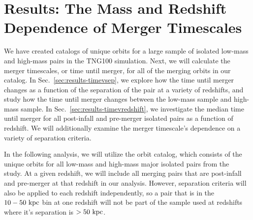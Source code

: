 \documentclass[twocolumn,linenumbers]{aastex631}
\begin{document}

\section{Results: The Mass and Redshift Dependence of Merger Timescales}
We have created catalogs of unique orbits for a large sample of isolated low-mass and high-mass pairs in the TNG100 simulation.
Next, we will calculate the merger timescales, or time until merger, for all of the merging orbits in our catalog. 
In Sec.~\ref{sec:results-timevsep}, we explore how the time until merger changes as a function of the separation of the pair at a variety of redshifts, and study how the time until merger changes between the low-mass sample and high-mass sample. 
In Sec.~\ref{sec:results-timevredshift}, we investigate the median time until merger for all post-infall and pre-merger isolated pairs as a function of redshift. 
We will additionally examine the merger timescale's dependence on a variety of separation criteria. 

In the following analysis, we will utilize the orbit catalog, which consists of the unique orbits for all low-mass and high-mass major isolated pairs from the~\citet{Chamberlain2024} study. 
At a given redshift, we will include all merging pairs that are post-infall and pre-merger at that redshift in our analysis. 
However, separation criteria will also be applied to each redshift independently, so a pair that is in the $10-50\,\mathrm{\,kpc}$ bin at one redshift will not be part of the sample used at redshifts where it's separation is $>50\,\mathrm{\,kpc}$.
\end{document}

